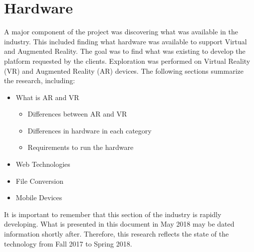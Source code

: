 
\section{Hardware}

	A major component of the project was discovering what was available in the industry.  This included finding what hardware was available to support Virtual and Augmented Reality.  The goal was to find what was existing to develop the platform requested by the clients.  Exploration was performed on Virtual Reality (VR) and Augmented Reality (AR) devices.  The following sections summarize the research, including:

	\begin{itemize}
		\item What is AR and VR
		\begin{itemize}
			\item Differences between AR and VR
			\item Differences in hardware in each category
			\item Requirements to run the hardware
		\end{itemize}

		\item Web Technologies
		\item File Conversion
		\item Mobile Devices
	\end{itemize}
	
	It is important to remember that this section of the industry is rapidly developing.  What is presented in this document in May 2018 may be dated information shortly after.  Therefore, this research reflects the state of the technology from Fall 2017 to Spring 2018.

	
	
	